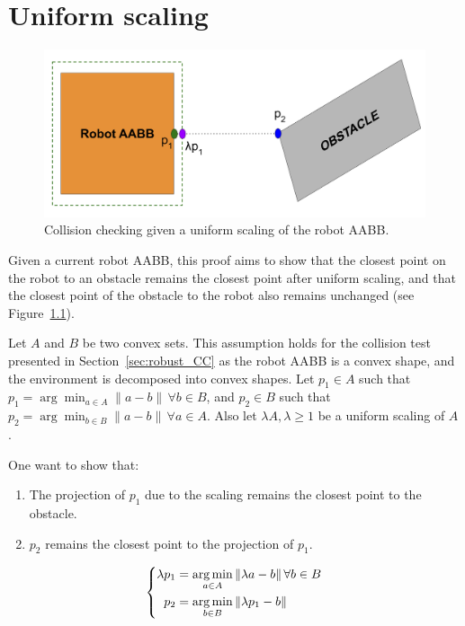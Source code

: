 \chapter{Uniform scaling}\label{chap:appendixA}

\begin{figure} [t]
    \centering
    \includegraphics[width=0.8\linewidth]{figures/appendix/CCellipse.png}
    \caption{Collision checking given a uniform scaling of the robot AABB.}
    \label{fig:appendix_A}
\end{figure}

Given a current robot AABB, this proof aims to show that the closest point on the robot to an obstacle remains the closest point after uniform scaling, and that the closest point of the obstacle to the robot also remains unchanged (see Figure~\ref{fig:appendix_A}).

Let $A$ and $B$ be two convex sets. 
This assumption holds for the collision test presented in Section~\ref{sec:robust_CC} as the robot AABB is a convex shape, and the environment is decomposed into convex shapes.
Let \( p_1 \in A \) such that \( p_1 = \arg \min_{a \in A} \|a - b\| \, \forall b \in B \), and \( p_2 \in B \) such that \( p_2 = \arg \min_{b \in B} \|a - b\| \, \forall a \in A \).
Also let $\lambda A, \lambda \geq 1$ be a uniform scaling of $A$.

One want to show that:
\begin{enumerate}
    \item The projection of $p_1$ due to the scaling remains the closest point to the obstacle.
    \item $p_2$ remains the closest point to the projection of $p_1$. 
\end{enumerate}
\[
    \left\{
    \begin{aligned}
        \lambda p_1 &= \operatorname*{arg\,min}_{a \in A} \|\lambda a - b\| \, \forall b \in B \\
        p_2 &= \operatorname*{arg\,min}_{b \in B} \|\lambda p_1 - b\|
    \end{aligned}
    \right.
\]

